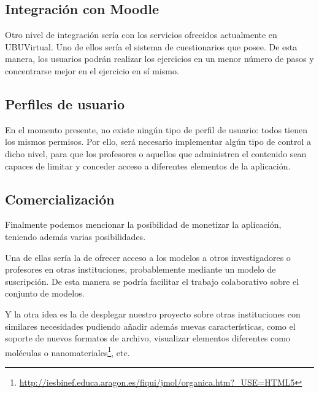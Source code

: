 \subsection{Integración con Moodle}
Otro nivel de integración sería con los servicios ofrecidos actualmente en UBUVirtual. Uno de ellos sería el sistema de cuestionarios que posee. De esta manera, los usuarios podrán realizar los ejercicios en un menor número de pasos y concentrarse mejor en el ejercicio en sí mismo.

\subsection{Perfiles de usuario}
En el momento presente, no existe ningún tipo de perfil de usuario: todos tienen los mismos permisos. Por ello, será necesario implementar algún tipo de control a dicho nivel, para que los profesores o aquellos que administren el contenido sean capaces de limitar y conceder acceso a diferentes elementos de la aplicación.

\subsection{Comercialización}
Finalmente podemos mencionar la posibilidad de monetizar la aplicación, teniendo además varias posibilidades.

Una de ellas sería la de ofrecer acceso a los modelos a otros investigadores o profesores en otras instituciones, probablemente mediante un modelo de suscripción. De esta manera se podría facilitar el trabajo colaborativo sobre el conjunto de modelos.

Y la otra idea es la de desplegar nuestro proyecto sobre otras instituciones con similares necesidades pudiendo añadir además nuevas características, como el soporte de nuevos formatos de archivo, visualizar elementos diferentes como moléculas o nanomateriales\footnote{\url{http://iesbinef.educa.aragon.es/fiqui/jmol/organica.htm?_USE=HTML5}}, etc.